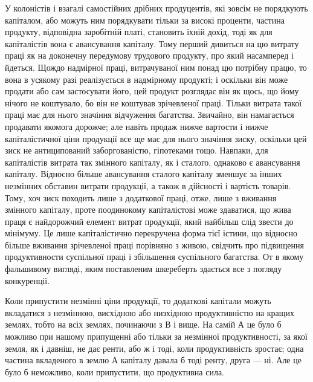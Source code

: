 У колоністів і взагалі самостійних дрібних продуцентів, які зовсім не
порядкують капіталом, або можуть ним порядкувати тільки за високі проценти,
частина продукту, відповідна заробітній платі, становить їхній дохід, тоді як
для капіталістів вона є авансування капіталу. Тому перший дивиться на цю
витрату праці як на доконечну передумову трудового продукту, про який насамперед
і йдеться. Щождо надмірної праці, витрачуваної ним понад цю потрібну
працю, то вона в усякому разі реалізується в надмірному продукті; і оскільки
він може продати або сам застосувати його, цей продукт розглядає він як
щось, що йому нічого не коштувало, бо він не коштував зрічевленої праці.
Тільки витрата такої праці має для нього значіння відчуження багатства. Звичайно,
він намагається продавати якомога дорожче; але навіть продаж нижче
вартости і нижче капіталістичної ціни продукції все ще має для нього значіння
зиску, оскільки цей зиск не антиципований заборгованістю, гіпотеками тощо.
Навпаки, для капіталістів витрата так змінного капіталу, як і сталого, однаково
є авансування капіталу. Відносно більше авансування сталого капіталу
зменшує за інших незмінних обставин витрати продукції, а також в дійсності і
вартість товарів. Тому, хоч зиск походить лише з додаткової праці, отже, лише
з вживання змінного капіталу, проте поодинокому капіталістові може здаватися,
що жива праця є найдорожчий елемент витрат продукції, який найбільш слід звести
до мінімуму. Це лише капіталістично перекручена форма тієї істини, що відносно
більше вживання зрічевленої праці порівняно з живою, свідчить про підвищення
продуктивности суспільної праці і збільшення суспільного багатства. От в якому фальшивому
вигляді, яким поставленим шкереберть здається все з погляду конкуренції.

Коли припустити незмінні ціни продукції, то додаткові капітали можуть
вкладатися з незмінною, висхідною або низхідною продуктивністю на кращих
землях, тобто на всіх землях, починаючи з В і вище. На самій А це було б
можливо при нашому припущенні або тільки за незмінної продуктивності, за
якої земля, як і давніш, не дає ренти, або ж і тоді, коли продуктивність зростає;
одна частина вкладеного в землю А капіталу давала б тоді ренту,
друга — ні. Але це було б неможливо, коли припустити, що продуктивна сила.
\parbreak{}  %

